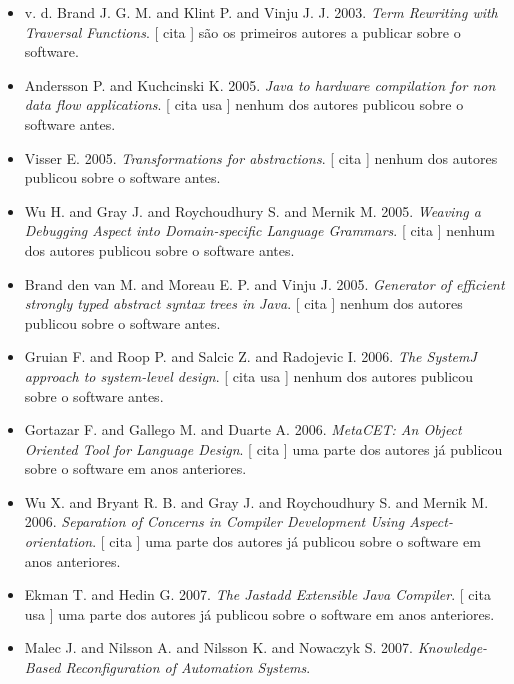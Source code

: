 \begin{itemize}
\item v. d. Brand J. G. M. and Klint P. and Vinju J. J.
      2003.
        \textit{ Term Rewriting with Traversal Functions}.
      [
          cita
      ]
são os primeiros autores a publicar sobre o software.
\item Andersson P. and Kuchcinski K.
      2005.
        \textit{ Java to hardware compilation for non data flow applications}.
      [
          cita
          usa
      ]
nenhum dos autores publicou sobre o software antes.
\item Visser E.
      2005.
        \textit{ Transformations for abstractions}.
      [
          cita
      ]
nenhum dos autores publicou sobre o software antes.
\item Wu H. and Gray J. and Roychoudhury S. and Mernik M.
      2005.
        \textit{ Weaving a Debugging Aspect into Domain-specific Language Grammars}.
      [
          cita
      ]
nenhum dos autores publicou sobre o software antes.
\item Brand den van M. and Moreau E. P. and Vinju J.
      2005.
        \textit{ Generator of efficient strongly typed abstract syntax trees in Java}.
      [
          cita
      ]
nenhum dos autores publicou sobre o software antes.
\item Gruian F. and Roop P. and Salcic Z. and Radojevic I.
      2006.
        \textit{ The SystemJ approach to system-level design}.
      [
          cita
          usa
      ]
nenhum dos autores publicou sobre o software antes.
\item Gortazar F. and Gallego M. and Duarte A.
      2006.
        \textit{ MetaCET: An Object Oriented Tool for Language Design}.
      [
          cita
      ]
uma parte dos autores já publicou sobre o software em anos anteriores.
\item Wu X. and Bryant R. B. and Gray J. and Roychoudhury S. and Mernik M.
      2006.
        \textit{ Separation of Concerns in Compiler Development Using Aspect-orientation}.
      [
          cita
      ]
uma parte dos autores já publicou sobre o software em anos anteriores.
\item Ekman T. and Hedin G.
      2007.
        \textit{ The Jastadd Extensible Java Compiler}.
      [
          cita
          usa
      ]
uma parte dos autores já publicou sobre o software em anos anteriores.
\item Malec J. and Nilsson A. and Nilsson K. and Nowaczyk S.
      2007.
        \textit{ Knowledge-Based Reconfiguration of Automation Systems}.

\end{itemize}
